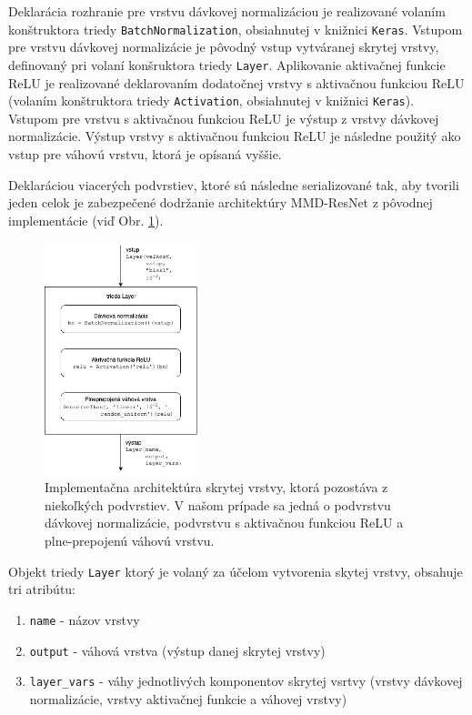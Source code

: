 Deklarácia rozhranie pre vrstvu dávkovej normalizáciou je realizované volaním konštruktora triedy \texttt{BatchNormalization}, obsiahnutej v knižnici \texttt{Keras}. Vstupom pre vrstvu dávkovej normalizácie je pôvodný vstup vytváranej skrytej vrstvy, definovaný pri volaní konšruktora triedy \texttt{Layer}. Aplikovanie aktivačnej funkcie ReLU je realizované deklarovaním dodatočnej vrstvy s aktivačnou funkciou ReLU (volaním konštruktora triedy \texttt{Activation}, obsiahnutej v knižnici \texttt{Keras}). Vstupom pre vrstvu s aktivačnou funkciou ReLU je výstup z vrstvy dávkovej normalizácie. Výstup vrstvy s aktivačnou funkciou ReLU je následne použitý ako vstup pre váhovú vrstvu, ktorá je opísaná vyššie. 

Deklaráciou viacerých podvrstiev, ktoré sú následne serializované tak, aby tvorili jeden celok je zabezpečené dodržanie architektúry MMD-ResNet z pôvodnej implementácie (viď Obr. \ref{impl_vrstva}).

\begin{figure}
\centerline{\includegraphics[width=0.4\textwidth]{images/skryta_vrstva.png}}
\caption[Implementačna architektúra skrytej vrstvy]{Implementačna architektúra skrytej vrstvy, ktorá pozostáva z niekoľkých podvrstiev. V našom prípade sa jedná o podvrstvu dávkovej normalizácie, podvrstvu s aktivačnou funkciou ReLU a plne-prepojenú váhovú vrstvu.}
\label{impl_vrstva}
\end{figure}

Objekt triedy \texttt{Layer} ktorý je volaný za účelom vytvorenia skytej vrstvy, obsahuje tri atribútu:
\begin{enumerate}
    \item \texttt{name} - názov vrstvy
    \item \texttt{output} - váhová vrstva (výstup danej skrytej vrstvy)
    \item \texttt{layer_vars} - váhy jednotlivých komponentov skrytej vsrtvy (vrstvy dávkovej normalizácie, vrstvy aktivačnej funkcie a váhovej vrstvy)
\end{enumerate}

